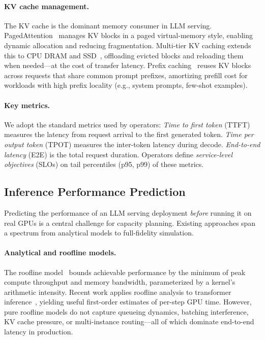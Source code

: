 \documentclass[11pt]{article}
\theoremstyle{plain} %
\theoremstyle{definition} %
\theoremstyle{remark} %
\numberwithin{equation}{section}
\begin{document}
\paragraph{KV cache management.}
The KV cache is the dominant memory consumer in LLM serving.
PagedAttention~\cite{kwon2023vllm} manages KV blocks in a paged virtual-memory style, enabling dynamic allocation and reducing fragmentation.
Multi-tier KV caching extends this to CPU DRAM and SSD~\cite{sheng2023flexgen, qin2024mooncake}, offloading evicted blocks and reloading them when needed---at the cost of transfer latency.
Prefix caching~\cite{zheng2023sglang} reuses KV blocks across requests that share common prompt prefixes, amortizing prefill cost for workloads with high prefix locality (e.g., system prompts, few-shot examples).

\paragraph{Key metrics.}
We adopt the standard metrics used by operators:
\emph{Time to first token} (TTFT) measures the latency from request arrival to the first generated token.
\emph{Time per output token} (TPOT) measures the inter-token latency during decode.
\emph{End-to-end latency} (E2E) is the total request duration.
Operators define \emph{service-level objectives} (SLOs) on tail percentiles (p95, p99) of these metrics.

\subsection{Inference Performance Prediction}
\label{subsec:bg-simulators}

Predicting the performance of an LLM serving deployment \emph{before} running it on real GPUs is a central challenge for capacity planning.
Existing approaches span a spectrum from analytical models to full-fidelity simulation.

\paragraph{Analytical and roofline models.}
The roofline model~\cite{williams2009roofline} bounds achievable performance by the minimum of peak compute throughput and memory bandwidth, parameterized by a kernel's arithmetic intensity.
Recent work applies roofline analysis to transformer inference~\cite{yuan2024llminference}, yielding useful first-order estimates of per-step GPU time.
However, pure roofline models do not capture queueing dynamics, batching interference, KV cache pressure, or multi-instance routing---all of which dominate end-to-end latency in production.
\end{document}
